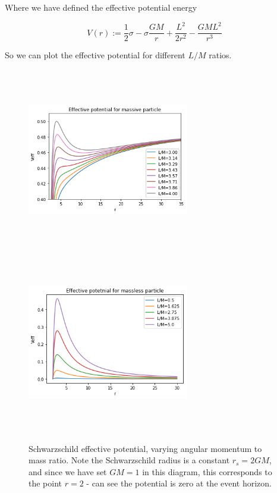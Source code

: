 \documentclass{article}
\begin{document}
Where we have defined the effective potential energy

\begin{equation}
    V\left(r\right) := \frac{1}{2} \sigma - \sigma \frac{G M}{r} + \frac{L^2}{2 r^2} - \frac{G M L^2}{r^3}
\label{eq:effective potential schwarzschild}
\end{equation}

So we can plot the effective potential for different $L/M$ ratios.

\begin{figure}[h]
    \centering
    \includegraphics[width=7cm, height=8cm]{images/massive_particle_S.png}
    \includegraphics[width=7cm, height=8cm]{images/massless_particle_S.png}
    \caption{Schwarzschild effective potential, varying angular momentum to mass ratio. Note the Schwarzschild radius is a constant $r_s=2 G M$, and since we have set $G M = 1$ in this diagram, this corresponds to the point $r=2$ - can see the potential is zero at the event horizon.}
    \label{fig:Schwarzschild effective potential}
\end{figure}
\end{document}

